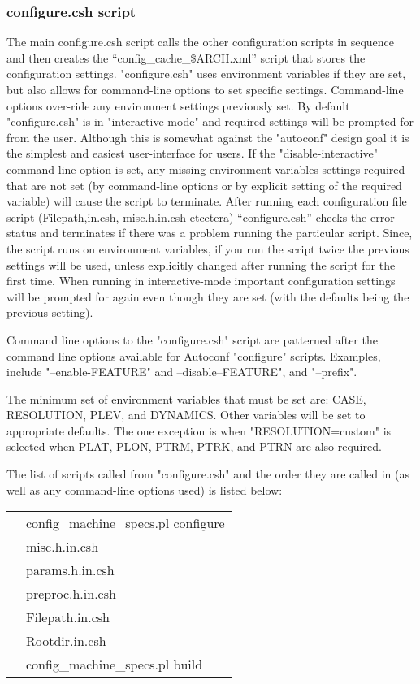 \documentclass[]{article}
\begin{document}
\subsubsection{configure.csh script}
The main configure.csh script calls the other configuration scripts in 
sequence and then creates the ``config\_cache\_\$ARCH.xml'' script that
stores the configuration settings. "configure.csh" uses environment
variables if they are set, but also allows for command-line options to 
set specific settings. Command-line options over-ride any environment
settings previously set. By default "configure.csh" is in "interactive-mode"
and required settings will be prompted for from the user. Although this is somewhat
against the "autoconf" design goal it is the simplest and easiest user-interface
for users. If the "disable-interactive" command-line option  is set, any missing environment 
variables settings required that
are not set (by command-line options or by explicit setting of the required variable)
will cause the script to terminate.  After running each configuration file script 
(Filepath,in.csh, misc.h.in.csh etcetera) ``configure.csh'' checks the error status and 
terminates if there was a problem running the particular script. Since, the script
runs on environment variables, if you run the script twice the previous settings
will be used, unless explicitly changed after running the script for the first time.
When running in interactive-mode important configuration settings will be prompted
for again even though they are set (with the defaults being the previous setting).

Command line options to the "configure.csh" script are patterned after
the command line options available for Autoconf "configure" scripts. Examples,
include "--enable-FEATURE" and --disable--FEATURE", and "--prefix".

The minimum set of environment variables that must be set are:
CASE, RESOLUTION, PLEV, and DYNAMICS.
Other variables will be set to appropriate defaults. The one exception
is when "RESOLUTION=custom" is selected when PLAT, PLON, PTRM, PTRK, and
PTRN are also required.

The list of scripts called from "configure.csh" and the order they
are called in (as well as any command-line options used) is listed below:\\

\begin{tabular}{r p{3.7in}}
  & config\_machine\_specs.pl configure \\
  & misc.h.in.csh \\
  & params.h.in.csh \\
  & preproc.h.in.csh \\
  & Filepath.in.csh \\
  & Rootdir.in.csh \\
  & config\_machine\_specs.pl build
\end{tabular}
\end{document}
